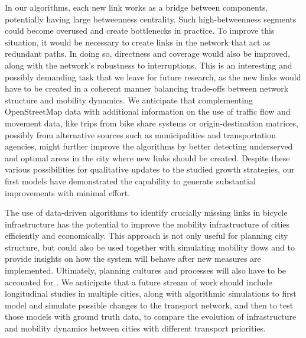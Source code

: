 In our algorithms, each new link works as a bridge between components, potentially having large betweenness centrality. Such high-betweenness segments could become overused and create bottlenecks in practice. To improve this situation, it would be necessary to create links in the network that act as redundant paths. In doing so, directness and coverage would also be improved, along with the network's robustness to interruptions. This is an interesting and possibly demanding task that we leave for future research, as the new links would have to be created in a coherent manner balancing trade-offs between network structure and mobility dynamics. We anticipate that complementing OpenStreetMap data with additional information on the use of traffic flow and movement data, like trips from bike share systems or origin-destination matrices, possibly from alternative sources such as municipalities and transportation agencies, might further improve the algorithms by better detecting underserved and optimal areas in the city where new links should be created. Despite these various possibilities for qualitative updates to the studied growth strategies, our first models have demonstrated the capability to generate substantial improvements with minimal effort.

The use of data-driven algorithms to identify crucially missing links in bicycle infrastructure has the potential to improve the mobility infrastructure of cities efficiently and economically. This approach is not only useful for planning city structure, but could also be used together with simulating mobility flows and to provide insights on how the system will behave after new measures are implemented. Ultimately, planning cultures and processes will also have to be accounted for \cite{zhao2018bicycle}. We anticipate that a future stream of work should include longitudinal studies \cite{carstensen2015spatio} in multiple cities, along with algorithmic simulations to first model and simulate possible changes to the transport network, and then to test those models with ground truth data, to compare the evolution of infrastructure and mobility dynamics between cities with different transport priorities.